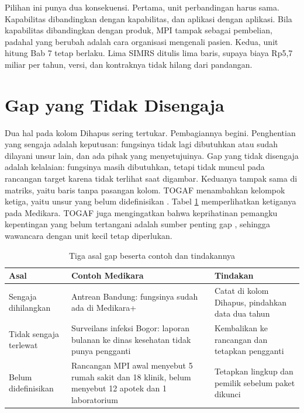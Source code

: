 Pilihan ini punya dua konsekuensi. Pertama, unit perbandingan harus sama. Kapabilitas
dibandingkan dengan kapabilitas, dan aplikasi dengan aplikasi. Bila kapabilitas
dibandingkan dengan produk, MPI tampak sebagai pembelian, padahal yang berubah adalah
cara organisasi mengenali pasien. Kedua, unit hitung Bab 7 tetap berlaku. Lima SIMRS
ditulis lima baris, supaya biaya Rp5,7 miliar per tahun, versi, dan kontraknya tidak
hilang dari pandangan.

\section{Gap yang Tidak Disengaja}

Dua hal pada kolom Dihapus sering tertukar. Pembagiannya begini. Penghentian yang
sengaja adalah keputusan: fungsinya tidak lagi dibutuhkan atau sudah dilayani unsur
lain, dan ada pihak yang menyetujuinya. Gap yang tidak disengaja adalah kelalaian:
fungsinya masih dibutuhkan, tetapi tidak muncul pada rancangan target karena tidak
terlihat saat digambar. Keduanya tampak sama di matriks, yaitu baris tanpa pasangan
kolom. TOGAF menambahkan kelompok ketiga, yaitu unsur yang belum didefinisikan
\cite{c11-togaf9-gap}. Tabel \ref{tab:ch11-asal-gap} memperlihatkan ketiganya pada
Medikara. TOGAF juga mengingatkan bahwa keprihatinan pemangku kepentingan yang belum
tertangani adalah sumber penting gap \cite{c11-togaf9-gap}, sehingga wawancara dengan unit
kecil tetap diperlukan.

\begin{table}[!htb]
  \centering
  \caption{Tiga asal gap beserta contoh dan tindakannya}
  \label{tab:ch11-asal-gap}
  \small
  \begin{tabularx}{\textwidth}{>{\raggedright\arraybackslash}p{2.7cm}>{\raggedright\arraybackslash}X>{\raggedright\arraybackslash}X}
    \hline
    \textbf{Asal} & \textbf{Contoh Medikara} & \textbf{Tindakan} \\ \hline
    Sengaja dihilangkan & Antrean Bandung: fungsinya sudah ada di Medikara+ &
      Catat di kolom Dihapus, pindahkan data dua tahun \\ \hline
    Tidak sengaja terlewat & Surveilans infeksi Bogor: laporan bulanan ke dinas
      kesehatan tidak punya pengganti & Kembalikan ke rancangan dan tetapkan pengganti \\ \hline
    Belum didefinisikan & Rancangan MPI awal menyebut 5 rumah sakit dan 18 klinik, belum
      menyebut 12 apotek dan 1 laboratorium & Tetapkan lingkup dan pemilik sebelum paket
      dikunci \\ \hline
  \end{tabularx}
\end{table}

